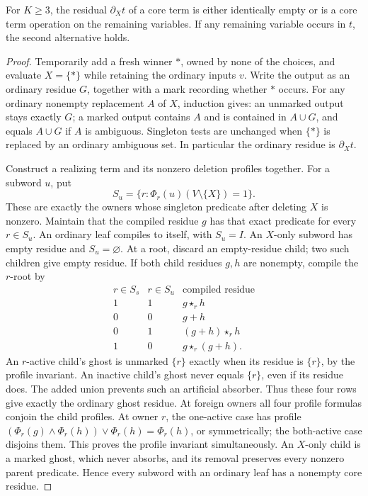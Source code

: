 \begin{theorem}\label{core:thm:neutral-elimination}
For $K\geq3$, the residual $\partial_Xt$ of a core term is either
identically empty or is a core term operation on the remaining variables.
If any remaining variable occurs in $t$, the second alternative holds.
\end{theorem}
\begin{proof}
Temporarily add a fresh winner $*$, owned by none of the choices, and
evaluate $X=\{*\}$ while retaining the ordinary inputs $v$.
Write the output as an ordinary residue $G$, together with a mark recording
whether $*$ occurs. For any ordinary nonempty replacement $A$ of $X$,
induction gives:
an unmarked output stays exactly $G$; a marked output contains $A$ and
is contained in $A\cup G$, and equals $A\cup G$ if $A$ is ambiguous.
Singleton tests are unchanged when $\{*\}$ is replaced by an ordinary
ambiguous set. In particular the ordinary residue is $\partial_Xt$.

Construct a realizing term and its nonzero deletion profiles together.
For a subword $u$, put
\[
 S_u=\{r:\Phi_r(u)(V\setminus\{X\})=1\}.
\]
These are exactly the owners whose singleton predicate after deleting
$X$ is nonzero. Maintain that the compiled residue $g$ has that exact
predicate for every $r\in S_u$. An ordinary leaf compiles to itself,
with $S_u=I$. An $X$-only subword has empty residue and $S_u=\varnothing$.
At a root, discard an empty-residue child; two such children give empty
residue. If both child residues $g,h$ are nonempty, compile the $r$-root by
\[
\begin{array}{c|c|l}
 r\in S_s&r\in S_u&\text{compiled residue}\\\hline
 1&1&g\star_rh\\
 0&0&g+h\\
 0&1&(g+h)\star_rh\\
 1&0&g\star_r(g+h).
\end{array}
\]
An $r$-active child's ghost is unmarked $\{r\}$ exactly when its
residue is $\{r\}$, by the profile invariant. An inactive child's ghost
never equals $\{r\}$, even if its residue does. The added union prevents
such an artificial absorber. Thus these four rows give exactly the
ordinary ghost residue. At foreign owners all four profile formulas
conjoin the child profiles. At owner $r$, the one-active case has
profile $(\Phi_r(g)\land\Phi_r(h))\lor\Phi_r(h)=\Phi_r(h)$,
or symmetrically; the both-active case disjoins them. This proves the
profile invariant simultaneously. An $X$-only child is a marked ghost,
which never absorbs, and its removal preserves every nonzero parent
predicate. Hence every subword with an ordinary leaf has a nonempty
core residue.
\end{proof}

